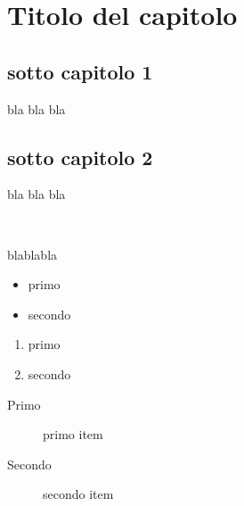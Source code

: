
\section{Titolo del capitolo}{
	\subsection{sotto capitolo 1}{
		bla bla bla	 }
	\subsection{sotto capitolo 2}{ 
		bla bla bla	}
}

\textbf{} %
\uppercase{} %
\emph{} %
\\ %

\tiny{} 
\small{}
\normalsize{}
\large{}
\Large{}
\huge{}
\Huge{}

blablabla 

\begin{itemize}
	\item primo
	\item secondo
\end{itemize}
\begin{enumerate}
	\item primo
	\item secondo
\end{enumerate}
\begin{description}
	\item[Primo] \hfill  primo item %
	\item[Secondo] secondo item
\end{description}

